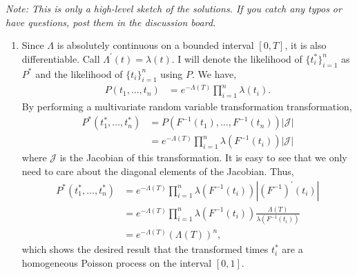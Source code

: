 \documentclass[11pt]{article}
\newcommand{\abs}[1]{\left\lvert#1\right\rvert}
\begin{document}
\begin{center}
  \setlength\fboxsep{0.5cm}
\end{center}

\textit{Note: This is only a high-level sketch of the solutions. If you catch any typos or have questions, post them in the discussion board.}


\begin{enumerate}

\item Since $\Lambda$ is absolutely continuous on a bounded interval $[0, T]$, it is also differentiable. Call $\Lambda^{\prime}(t) = \lambda(t)$. I will denote the likelihood of $\{ t_i^*\}_{i=1}^n$ as $P^*$ and the likelihood of $\{t_i\}_{i=1}^n$ using $P$. We have,
\begin{align*}
	P(t_1, \dots, t_n) &= e^{-\Lambda(T)} \prod_{i=1}^n \lambda(t_i).
\end{align*}
By performing a multivariate random variable transformation transformation,
\begin{align*}
	P^*(t_1^*, \dots, t_n^*) &= P(F^{-1}(t_1), \dots, F^{-1}(t_n)) \abs{\mathcal{J}} \\
	&= e^{-\Lambda(T)} \prod_{i=1}^n \lambda(F^{-1}(t_i)) \abs{\mathcal{J}}
\end{align*}
where $\mathcal{J}$ is the Jacobian of this transformation. It is easy to see that we only need to care about the diagonal elements of the Jacobian. Thus,
\begin{align*}
	P^*(t_1^*, \dots, t_n^*) &= e^{-\Lambda(T)} \prod_{i=1}^n \lambda(F^{-1}(t_i)) \abs{(F^{-1})^{\prime}(t_i)} \\
	&=  e^{-\Lambda(T)} \prod_{i=1}^n \lambda(F^{-1}(t_i)) \frac{\Lambda(T)}{\lambda(F^{-1}(t_i))} \\
	&= e^{-\Lambda(T)} (\Lambda(T))^n,
\end{align*}
which shows the desired result that the transformed times $t_i^*$ are a homogeneous Poisson process on the interval $[0, 1]$.


\end{enumerate}
\end{document}
